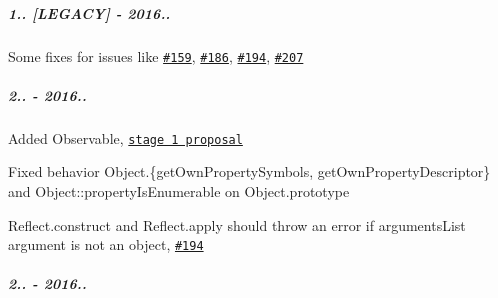 \subparagraph*{1.. \mbox{[}L\+E\+G\+A\+CY\mbox{]} -\/ 2016..}


\begin{DoxyItemize}
\item Some fixes for issues like \href{https://github.com/zloirock/core-js/issues/159}{\tt \#159}, \href{https://github.com/zloirock/core-js/issues/186}{\tt \#186}, \href{https://github.com/zloirock/core-js/issues/194}{\tt \#194}, \href{https://github.com/zloirock/core-js/issues/207}{\tt \#207}
\end{DoxyItemize}

\subparagraph*{2.. -\/ 2016..}


\begin{DoxyItemize}
\item Added {\ttfamily Observable}, \href{https://github.com/zenparsing/es-observable}{\tt stage 1 proposal}
\item Fixed behavior {\ttfamily Object.\{get\+Own\+Property\+Symbols, get\+Own\+Property\+Descriptor\}} and {\ttfamily Object\+::property\+Is\+Enumerable} on {\ttfamily Object.\+prototype}
\item {\ttfamily Reflect.\+construct} and {\ttfamily Reflect.\+apply} should throw an error if {\ttfamily arguments\+List} argument is not an object, \href{https://github.com/zloirock/core-js/issues/194}{\tt \#194}
\end{DoxyItemize}

\subparagraph*{2.. -\/ 2016..}


